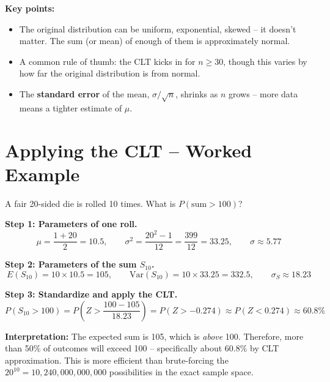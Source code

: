\documentclass[11pt, letterpaper]{article}
\begin{document}
\textbf{Key points:}
\begin{itemize}[noitemsep]
  \item The original distribution can be uniform, exponential, skewed -- it doesn't matter. The sum (or mean) of enough of them is approximately normal.
  \item A common rule of thumb: the CLT kicks in for $n \geq 30$, though this varies by how far the original distribution is from normal.
  \item The \textbf{standard error} of the mean, $\sigma/\sqrt{n}$, shrinks as $n$ grows -- more data means a tighter estimate of $\mu$.
\end{itemize}

\section*{Applying the CLT -- Worked Example}

\begin{tcolorbox}[colback=part2bg, colframe=sectiongreen,
  title={\bfseries Problem: 20-sided die, 10 rolls}, arc=3pt, boxrule=1pt]
A fair 20-sided die is rolled 10 times. What is $P(\text{sum} > 100)$?
\end{tcolorbox}

\textbf{Step 1: Parameters of one roll.}
\[
  \mu = \frac{1+20}{2} = 10.5, \qquad \sigma^2 = \frac{20^2-1}{12} = \frac{399}{12} = 33.25, \qquad \sigma \approx 5.77
\]

\textbf{Step 2: Parameters of the sum $S_{10}$.}
\[
  E(S_{10}) = 10 \times 10.5 = 105, \qquad \text{Var}(S_{10}) = 10 \times 33.25 = 332.5, \qquad \sigma_{S} \approx 18.23
\]

\textbf{Step 3: Standardize and apply the CLT.}
\[
  P(S_{10} > 100) = P\!\left(Z > \frac{100 - 105}{18.23}\right) = P(Z > -0.274) \approx P(Z < 0.274) \approx \mathbf{60.8\%}
\]

\begin{tcolorbox}[colback=part2bg, colframe=sectiongreen, arc=3pt, boxrule=1pt]
\textbf{Interpretation:} The expected sum is 105, which is \emph{above} 100. Therefore, more than 50\% of outcomes will exceed 100 -- specifically about 60.8\% by CLT approximation. This is more efficient than brute-forcing the $20^{10} = 10{,}240{,}000{,}000{,}000$ possibilities in the exact sample space.
\end{tcolorbox}

\newpage
\end{document}
